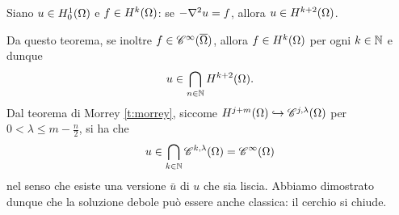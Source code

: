 \begin{teorema}
    Siano $u\in\sobHc[1]{\Omega}$ e $f\in\sobH[k]{\Omega}$: se $-\lap u=f$, allora $u\in\sobH[k+2]{\Omega}$.
\end{teorema}
Da questo teorema, se inoltre $f\in\cont[\infty]{\clos{\Omega}}$, allora $f\in\sobH[k]{\Omega}$ per ogni $k\in\N$ e dunque
\begin{equation}
    u\in\bigcap_{n\in\N}\sobH[k+2]{\Omega}.
\end{equation}
Dal teorema di Morrey \ref{t:morrey}, siccome $\sobH[j+m]{\Omega}\emb\cont[j,\lambda]{\Omega}$ per $0<\lambda\le m-\frac{n}2$, si ha che
\begin{equation}
    u\in\bigcap_{k\in\N}\cont[k,\lambda]{\Omega}=\cont[\infty]{\Omega}
\end{equation}
nel senso che esiste una versione $\bar{u}$ di $u$ che sia liscia.
Abbiamo dimostrato dunque che la soluzione debole può essere anche classica: il cerchio si chiude.
